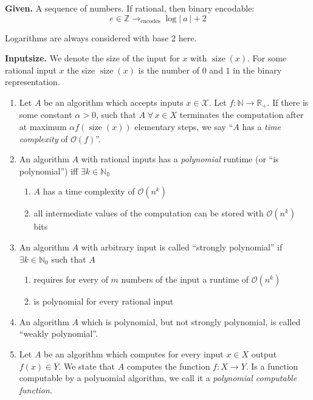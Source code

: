 \documentclass{article}
\newcommand{\card}[1]{\left|\:\!#1\:\!\right|}
\newcommand{\given}[1]{\textbf{Given.} #1\par}
\newcommand{\fall}{\;\forall\,}
\begin{document}
\given{A sequence of numbers. If rational, then binary encodable:
\[
  e \in \mathbb{Z} \rightarrow_{\text{encodes}} \log{\card{a} + 2}
\]}

Logarithms are always considered with base $2$ here.

\textbf{Inputsize.} We denote the size of the input for $x$ with $\operatorname{size}(x)$. For some rational input $x$ the size $\operatorname{size}(x)$ is the number of $0$ and $1$ in the binary representation.

\begin{enumerate}
  \item Let $A$ be an algorithm which accepts inputs $x \in \mathcal{X}$. Let $f: \mathbb{N} \rightarrow \mathbb{R}_+$. If there is some constant $\alpha > 0$, such that $A \fall x \in X$ terminates the computation after at maximum $\alpha f(\operatorname{size}(x))$ elementary steps, we say ``$A$ has a \emph{time complexity} of $\mathcal{O}(f)$''.

  \item An algorithm $A$ with rational inputs has a \emph{polynomial} runtime (or ``is polynomial'') iff $\exists k \in \mathbb{N_0}$
    \begin{enumerate}
      \item $A$ has a time complexity of $\mathcal{O}(n^k)$
      \item all intermediate values of the computation can be stored with $\mathcal{O}(n^k)$ bits
    \end{enumerate}

  \item An algorithm $A$ with arbitrary input is called ``strongly polynomial'' if $\exists k \in \mathbb{N}_0$ such that $A$
    \begin{enumerate}
      \item requires for every of $m$ numbers of the input a runtime of $\mathcal{O}(n^k)$
      \item is polynomial for every rational input
    \end{enumerate}

  \item An algorithm $A$ which is polynomial, but not strongly polynomial, is called ``weakly polynomial''.

  \item Let $A$ be an algorithm which computes for every input $x \in X$ output $f(x) \in Y$. We state that $A$ computes the function $f: X \rightarrow Y$. Is a function computable by a polynomial algorithm, we call it a \emph{polynomial computable function}.
\end{enumerate}
\end{document}
